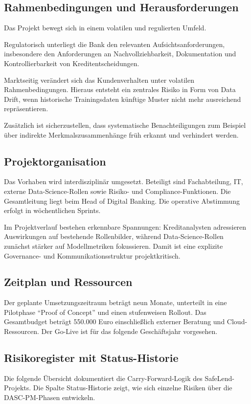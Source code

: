 \subsection{Rahmenbedingungen und Herausforderungen}
Das Projekt bewegt sich in einem volatilen und regulierten Umfeld.

Regulatorisch unterliegt die Bank den relevanten Aufsichtsanforderungen,
insbesondere den Anforderungen an Nachvollziehbarkeit,
Dokumentation und Kontrollierbarkeit von Kreditentscheidungen.

Marktseitig verändert sich das Kundenverhalten
unter volatilen Rahmenbedingungen.
Hieraus entsteht ein zentrales Risiko in Form von Data Drift,
wenn historische Trainingsdaten künftige Muster
nicht mehr ausreichend repräsentieren.

Zusätzlich ist sicherzustellen,
dass systematische Benachteiligungen
zum Beispiel über indirekte Merkmalszusammenhänge
früh erkannt und verhindert werden.

\subsection{Projektorganisation}
Das Vorhaben wird interdisziplinär umgesetzt.
Beteiligt sind Fachabteilung, IT, externe Data-Science-Rollen
sowie Risiko- und Compliance-Funktionen.
Die Gesamtleitung liegt beim Head of Digital Banking.
Die operative Abstimmung erfolgt in wöchentlichen Sprints.

Im Projektverlauf bestehen erkennbare Spannungen:
Kreditanalysten adressieren Auswirkungen auf bestehende Rollenbilder,
während Data-Science-Rollen zunächst stärker
auf Modellmetriken fokussieren.
Damit ist eine explizite Governance- und Kommunikationsstruktur
projektkritisch.

\subsection{Zeitplan und Ressourcen}
Der geplante Umsetzungszeitraum beträgt neun Monate,
unterteilt in eine Pilotphase
\enquote{Proof of Concept}
und einen stufenweisen Rollout.
Das Gesamtbudget beträgt 550.000 Euro
einschließlich externer Beratung und Cloud-Ressourcen.
Der Go-Live ist für das folgende Geschäftsjahr vorgesehen.

\subsection{Risikoregister mit Status-Historie}
Die folgende Übersicht dokumentiert die Carry-Forward-Logik des SafeLend-Projekts.
Die Spalte Status-Historie zeigt, wie sich einzelne Risiken über die DASC-PM-Phasen entwickeln.

